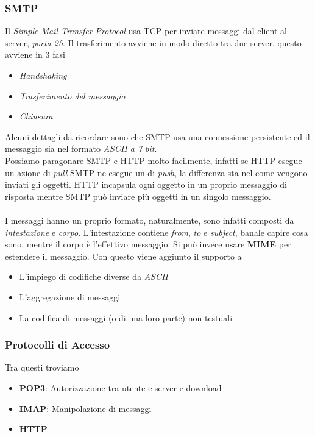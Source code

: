 \documentclass{article}
\begin{document}
            \subsubsection{SMTP}
                Il \textit{Simple Mail Transfer Protocol} usa TCP per inviare messaggi dal client al server, \textit{porta 25}. Il trasferimento avviene in modo diretto tra due server, questo avviene in 3 fasi
                \begin{itemize}
                    \item \textit{Handshaking}
                    \item \textit{Trasferimento del messaggio}
                    \item \textit{Chiusura} 
                \end{itemize}
                Alcuni dettagli da ricordare sono che SMTP usa una connessione persistente ed il messaggio sia nel formato \textit{ASCII a 7 bit}.\\
                Possiamo paragonare SMTP e HTTP molto facilmente, infatti se HTTP esegue un azione di \textit{pull} SMTP ne esegue un di \textit{push}, la differenza sta nel come vengono inviati gli oggetti. HTTP incapsula ogni oggetto in un proprio messaggio di risposta mentre SMTP può inviare più oggetti in un singolo messaggio.\\
                \\
                I messaggi hanno un proprio formato, naturalmente, sono infatti composti da \textit{intestazione} e \textit{corpo}. L'intestazione contiene \textit{from}, \textit{to} e \textit{subject}, banale capire cosa sono, mentre il corpo è l'effettivo messaggio. Si può invece usare \textbf{MIME} per estendere il messaggio. Con questo viene aggiunto il supporto a
                \begin{itemize}
                    \item L'impiego di codifiche diverse da \textit{ASCII}
                    \item L'aggregazione di messaggi
                    \item La codifica di messaggi (o di una loro parte) non testuali
                \end{itemize}

            \subsubsection{Protocolli di Accesso}
                Tra questi troviamo
                \begin{itemize}
                    \item \textbf{POP3}: Autorizzazione tra utente e server e download
                    \item \textbf{IMAP}: Manipolazione di messaggi
                    \item \textbf{HTTP}
                \end{itemize}
\end{document}
